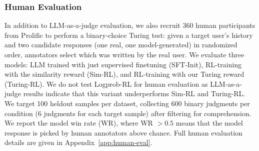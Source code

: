 \documentclass{article} %
\begin{document}
\subsubsection{Human Evaluation}

In addition to LLM-as-a-judge evaluation, we also recruit 360 human participants from Prolific to perform a binary-choice Turing test: given a target user's history and two candidate responses (one real, one model-generated) in randomized order, annotators select which was written by the real user. We evaluate three models: LLM trained with just supervised finetuning (SFT-Init), RL-training with the similarity reward (Sim-RL), and RL-training with our Turing reward (Turing-RL). We do not test Logprob-RL for human evaluation as LLM-as-a-judge results indicate that this variant underperforms Sim-RL and Turing-RL. We target 100 heldout samples per dataset, collecting 600 binary judgments per condition (6 judgments for each target sample) after filtering for comprehension. We report the model win rate (WR), where WR ${>} 0.5$ means that the model response is picked by human annotators above chance. Full human evaluation details are given in Appendix~\ref{app:human-eval}.






\end{document}
